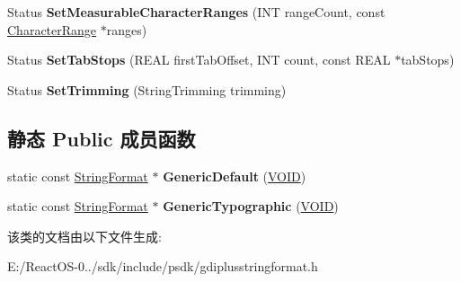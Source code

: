 \begin{DoxyCompactItemize}
\item 
\mbox{\label{class_string_format_a617b954bf1ad8e99cde8503a2249d16b}} 
Status {\bfseries Set\+Measurable\+Character\+Ranges} (I\+NT range\+Count, const \hyperlink{struct_character_range}{Character\+Range} $\ast$ranges)
\item 
\mbox{\label{class_string_format_ac6b848c351d12d9a89cfb265a26a1d05}} 
Status {\bfseries Set\+Tab\+Stops} (R\+E\+AL first\+Tab\+Offset, I\+NT count, const R\+E\+AL $\ast$tab\+Stops)
\item 
\mbox{\label{class_string_format_a677fb39ffeed3f421143bd1690d7e061}} 
Status {\bfseries Set\+Trimming} (String\+Trimming trimming)
\end{DoxyCompactItemize}
\subsection*{静态 Public 成员函数}
\begin{DoxyCompactItemize}
\item 
\mbox{\label{class_string_format_a55a9f785e2a07b8f7cd705ddb6bf60d8}} 
static const \hyperlink{class_string_format}{String\+Format} $\ast$ {\bfseries Generic\+Default} (\hyperlink{interfacevoid}{V\+O\+ID})
\item 
\mbox{\label{class_string_format_a8e25a01dfc47d422a4fe192d75873603}} 
static const \hyperlink{class_string_format}{String\+Format} $\ast$ {\bfseries Generic\+Typographic} (\hyperlink{interfacevoid}{V\+O\+ID})
\end{DoxyCompactItemize}


该类的文档由以下文件生成\+:\begin{DoxyCompactItemize}
\item 
E\+:/\+React\+O\+S-\/0../sdk/include/psdk/gdiplusstringformat.\+h\end{DoxyCompactItemize}
